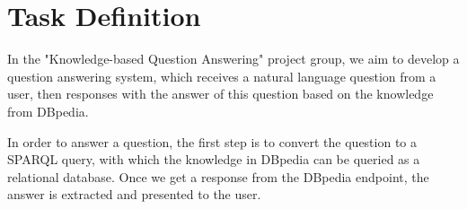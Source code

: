 
\section{Task Definition}


In the "Knowledge-based Question Answering" project group, 
we aim to develop a question answering system, 
which receives a natural language question from a user, 
then responses with the answer of this question based on the knowledge from DBpedia. 

In order to answer a question,
the first step is to convert the question to a SPARQL query,
with which the knowledge in DBpedia can be queried as a relational database. 
Once we get a response from the DBpedia endpoint, 
the answer is extracted and presented to the user. 

